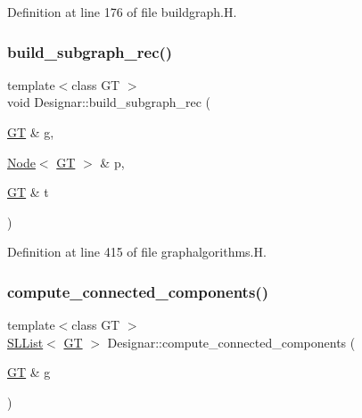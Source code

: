 Definition at line 176 of file buildgraph.\+H.

\mbox{\label{namespace_designar_a035e48f6f48994ed7b1fd8c6d7f3ec32}} 
\subsubsection{\texorpdfstring{build\+\_\+subgraph\+\_\+rec()}{build\_subgraph\_rec()}}
{\footnotesize\ttfamily template$<$class GT $>$ \\
void Designar\+::build\+\_\+subgraph\+\_\+rec (\begin{DoxyParamCaption}\item[{\hyperlink{demo-buildgraph_8_c_a3001c40d2c31ca87ed96cd7d1334a55e}{GT} \&}]{g,  }\item[{\hyperlink{namespace_designar_a5af326c65aa2bd26b26c410f2030d09e}{Node}$<$ \hyperlink{demo-buildgraph_8_c_a3001c40d2c31ca87ed96cd7d1334a55e}{GT} $>$ \&}]{p,  }\item[{\hyperlink{demo-buildgraph_8_c_a3001c40d2c31ca87ed96cd7d1334a55e}{GT} \&}]{t }\end{DoxyParamCaption})}



Definition at line 415 of file graphalgorithms.\+H.

\mbox{\label{namespace_designar_a1f5287eee752172e2db8bd4cd148f93b}} 
\subsubsection{\texorpdfstring{compute\+\_\+connected\+\_\+components()}{compute\_connected\_components()}}
{\footnotesize\ttfamily template$<$class GT $>$ \\
\hyperlink{class_designar_1_1_s_l_list}{S\+L\+List}$<$ \hyperlink{demo-buildgraph_8_c_a3001c40d2c31ca87ed96cd7d1334a55e}{GT} $>$ Designar\+::compute\+\_\+connected\+\_\+components (\begin{DoxyParamCaption}\item[{\hyperlink{demo-buildgraph_8_c_a3001c40d2c31ca87ed96cd7d1334a55e}{GT} \&}]{g }\end{DoxyParamCaption})}



